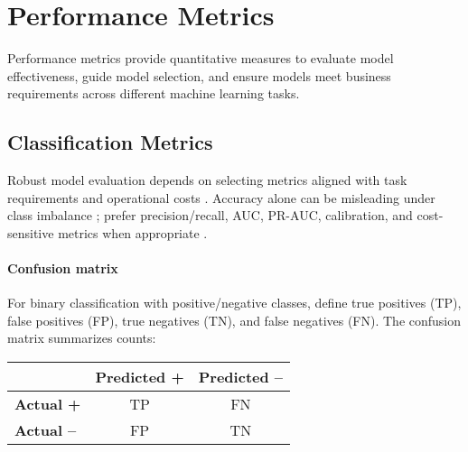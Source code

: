 
\section{Performance Metrics }
\label{sec:performance-metrics}

Performance metrics provide quantitative measures to evaluate model effectiveness, guide model selection, and ensure models meet business requirements across different machine learning tasks.

\subsection{Classification Metrics}

Robust model evaluation depends on selecting metrics aligned with task requirements and operational costs . Accuracy alone can be misleading under class imbalance ; prefer precision/recall, AUC, PR-AUC, calibration, and cost-sensitive metrics when appropriate \textcite{GoodfellowEtAl2016,Prince2023}.

\paragraph{Confusion matrix} For binary classification with positive/negative classes, define true positives (TP), false positives (FP), true negatives (TN), and false negatives (FN). The confusion matrix  summarizes counts:

\begin{center}
\begin{tabular}{@{}lcc@{}}\toprule
 & \textbf{Predicted +} & \textbf{Predicted --} \\
\midrule
\textbf{Actual +} & TP & FN \\
\textbf{Actual --} & FP & TN \\
\bottomrule
\end{tabular}
\end{center}

